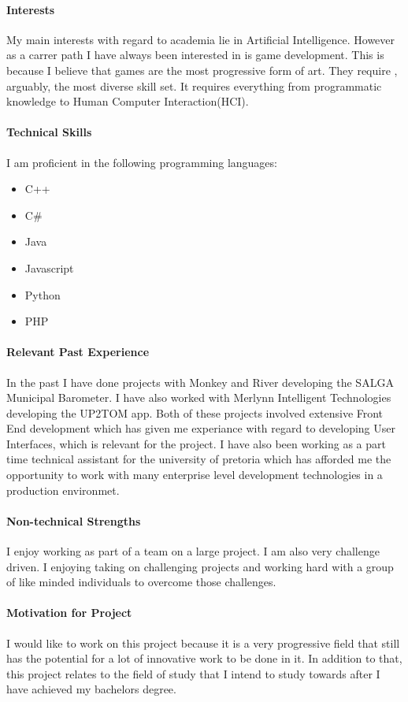 \documentclass[12pt]{article}
\begin{document}
\paragraph{Interests}
My main interests with regard to academia lie in Artificial Intelligence. However as a carrer path I have always been interested in is game development. This is because I believe that games are the most progressive form of art. They require , arguably, the most diverse skill set. It requires everything from programmatic knowledge to Human Computer Interaction(HCI). 

\paragraph{Technical Skills}
	I am proficient in the following programming languages:
	\begin{itemize}
		\item C++
		\item C#
		\item Java
		\item Javascript
		\item Python
		\item PHP
	\end{itemize}

\paragraph{Relevant Past Experience}
	In the past I have done projects with Monkey and River developing the SALGA Municipal Barometer. I have also worked with Merlynn Intelligent Technologies developing the UP2TOM app. Both of these projects involved extensive Front End development which has given me experiance with regard to developing User Interfaces, which is relevant for the project. I have also been working as a part time technical assistant for the university of pretoria which has afforded me the opportunity to work with many enterprise level development technologies in a production environmet.

\paragraph{Non-technical Strengths}
	I enjoy working as part of a team on a large project. I am also very challenge driven. I enjoying taking on challenging projects and working hard with a group of like minded individuals to overcome those challenges.

\paragraph{Motivation for Project}
	I would like to work on this project because it is a very progressive field that still has the potential for a lot of innovative work to be done in it. In addition to that, this project relates to the field of study that I intend to study towards after I have achieved my bachelors degree.
\end{document}
